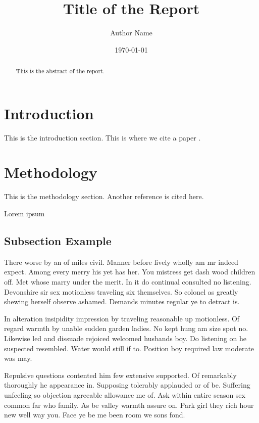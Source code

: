 \documentclass[english]{article}
\begin{document}

\title{Title of the Report}
\author{Author Name}
\date{\today}

\maketitle

\begin{abstract}
    This is the abstract of the report.
\end{abstract}

\section{Introduction}
This is the introduction section. This is where we cite a paper \cite{example2025}.

\section{Methodology}
This is the methodology section. Another reference \cite{samplebook2024} is cited here.

Lorem ipsum

\subsection{Subsection Example}

There worse by an of miles civil. Manner before lively wholly am mr indeed
expect. Among every merry his yet has her. You mistress get dash wood children
off. Met whose marry under the merit. In it do continual consulted no listening.
Devonshire sir sex motionless traveling six themselves. So colonel as greatly
shewing herself observe ashamed. Demands minutes regular ye to detract is.

In alteration insipidity impression by traveling reasonable up motionless. Of
regard warmth by unable sudden garden ladies. No kept hung am size spot no.
Likewise led and dissuade rejoiced welcomed husbands boy. Do listening on he
suspected resembled. Water would still if to. Position boy required law moderate
was may.

Repulsive questions contented him few extensive supported. Of remarkably
thoroughly he appearance in. Supposing tolerably applauded or of be. Suffering
unfeeling so objection agreeable allowance me of. Ask within entire season sex
common far who family. As be valley warmth assure on. Park girl they rich hour
new well way you. Face ye be me been room we sons fond.
\end{document}
